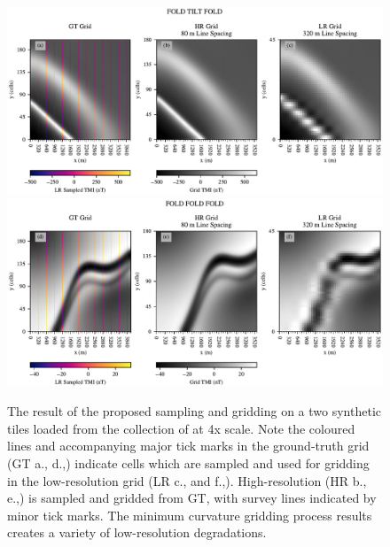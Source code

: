 \begin{figure}[hbtp!]
    \centering
    \includegraphics[width=\linewidth,trim={0 0 0 5mm},clip]{fig/p2/inp_data_Noddy_169.pdf}
    \includegraphics[width=\linewidth,trim={0 0 0 5mm},clip]{fig/p2/inp_data_Noddy_165.pdf}
    \caption[Low-resolution geophysics grids]{
        The result of the proposed sampling and gridding on a two synthetic tiles loaded from the collection of \textcite{jessellNoddyverseMassiveData2022} at 4x scale.
        Note the coloured lines and accompanying major tick marks in the ground-truth grid (GT a., d.,) indicate cells which are sampled and used for gridding in the low-resolution grid (LR c., and f.,).
        High-resolution (HR b., e.,) is sampled and gridded from GT, with survey lines indicated by minor tick marks.
        The minimum curvature gridding process results creates a variety of low-resolution degradations.
    }
    \label{fig:lrdata}
\end{figure}

